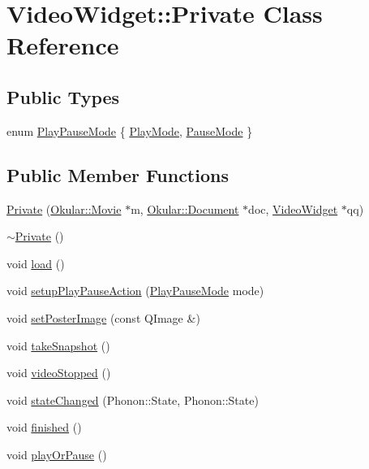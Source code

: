 \hypertarget{classVideoWidget_1_1Private}{\section{Video\+Widget\+:\+:Private Class Reference}
\label{classVideoWidget_1_1Private}
}
\subsection*{Public Types}
\begin{DoxyCompactItemize}
\item 
enum \hyperlink{classVideoWidget_1_1Private_aa685363ecfd1874cfe0a9901cd86ede2}{Play\+Pause\+Mode} \{ \hyperlink{classVideoWidget_1_1Private_aa685363ecfd1874cfe0a9901cd86ede2a4211aefb1bf1a9dba29b939c6b811d33}{Play\+Mode}, 
\hyperlink{classVideoWidget_1_1Private_aa685363ecfd1874cfe0a9901cd86ede2aab1e1758af40992f1fd9a0e51758c921}{Pause\+Mode}
 \}
\end{DoxyCompactItemize}
\subsection*{Public Member Functions}
\begin{DoxyCompactItemize}
\item 
\hyperlink{classVideoWidget_1_1Private_acfdb365e3b1c968ebfb426807a05b056}{Private} (\hyperlink{classOkular_1_1Movie}{Okular\+::\+Movie} $\ast$m, \hyperlink{classOkular_1_1Document}{Okular\+::\+Document} $\ast$doc, \hyperlink{classVideoWidget}{Video\+Widget} $\ast$qq)
\item 
\hyperlink{classVideoWidget_1_1Private_a29c759787bb0699156ada9bb5d6f80e8}{$\sim$\+Private} ()
\item 
void \hyperlink{classVideoWidget_1_1Private_affa15ed191c16d315167e362e9823466}{load} ()
\item 
void \hyperlink{classVideoWidget_1_1Private_a6f2d55d3df5ed98d793bf208b5128708}{setup\+Play\+Pause\+Action} (\hyperlink{classVideoWidget_1_1Private_aa685363ecfd1874cfe0a9901cd86ede2}{Play\+Pause\+Mode} mode)
\item 
void \hyperlink{classVideoWidget_1_1Private_a7c61e05ab9b3b65f7496914e1a630c94}{set\+Poster\+Image} (const Q\+Image \&)
\item 
void \hyperlink{classVideoWidget_1_1Private_accc5bdb8687d84aa3e2cf234993c12f5}{take\+Snapshot} ()
\item 
void \hyperlink{classVideoWidget_1_1Private_a57b0c44fc74f21e280cfc3ad962406c1}{video\+Stopped} ()
\item 
void \hyperlink{classVideoWidget_1_1Private_a1021aa08f3477c50aaed6611005be431}{state\+Changed} (Phonon\+::\+State, Phonon\+::\+State)
\item 
void \hyperlink{classVideoWidget_1_1Private_ad900b90653270bcb87e0acd5f353ed1b}{finished} ()
\item 
void \hyperlink{classVideoWidget_1_1Private_af20462611a066df9e048d421ab5dc0c1}{play\+Or\+Pause} ()
\end{DoxyCompactItemize}
